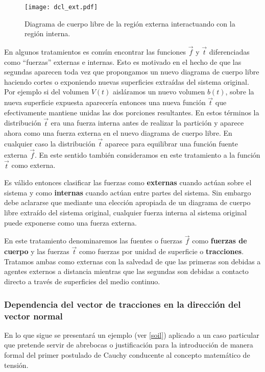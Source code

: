 \documentclass[../notas medios.tex]{subfiles}
\begin{document}
\begin{figure}[H]
\centering
	\texttt{[image: dcl\_ext.pdf]}
	\caption{Diagrama de cuerpo libre de la región externa interactuando con la
	región interna.}
	\label{dcl_ext}
\end{figure}

En algunos tratamientos es común encontrar las funciones $\vec f$ y $\vec t$ 
diferenciadas como “fuerzas” externas e internas. Esto es motivado en el hecho
de que las segundas aparecen toda vez que propongamos un nuevo diagrama de
cuerpo libre haciendo cortes o exponiendo nuevas superficies extraídas del
sistema original. Por ejemplo si del volumen $V(t)$ aisláramos un nuevo volumen
$b(t)$, sobre la nueva superficie expuesta aparecería entonces una nueva función
$\vec t$ que efectivamente mantiene unidas las dos porciones resultantes. En
estos términos la distribución $\vec t$ era una fuerza interna antes de realizar
la partición y aparece ahora como una fuerza externa en el nuevo diagrama de
cuerpo libre. En cualquier caso la distribución $\vec t$ aparece para equilibrar
una función fuente externa $\vec f$. En este sentido también consideramos en
este tratamiento a la función $\vec t$ como externa.

Es válido entonces clasificar las fuerzas como {\bf externas} cuando actúan
sobre el sistema y como {\bf internas} cuando actúan entre partes del sistema.
Sin embargo debe aclararse que mediante una elección apropiada de un diagrama de
cuerpo libre extraído del sistema original, cualquier fuerza interna al sistema
original puede exponerse como una fuerza externa.

En este tratamiento denominaremos las fuentes o fuerzas $\vec f$ como {\bf
fuerzas de cuerpo} y las fuerzas $\vec t$ como fuerzas por unidad de superficie
o {\bf tracciones}.
Tratamos ambas como externas con la salvedad de que las primeras son debidas a
agentes externos a distancia mientras que las segundas son debidas a contacto
directo a través de superficies del medio continuo.

\subsubsection{Dependencia del vector de tracciones en la dirección del vector normal}
En lo que sigue se presentará un ejemplo (ver \cref{soil}) aplicado a un caso
particular que pretende servir de abrebocas o justificación para la introducción
de manera formal del primer postulado de Cauchy conducente al concepto matemático de tensión.
\end{document}
